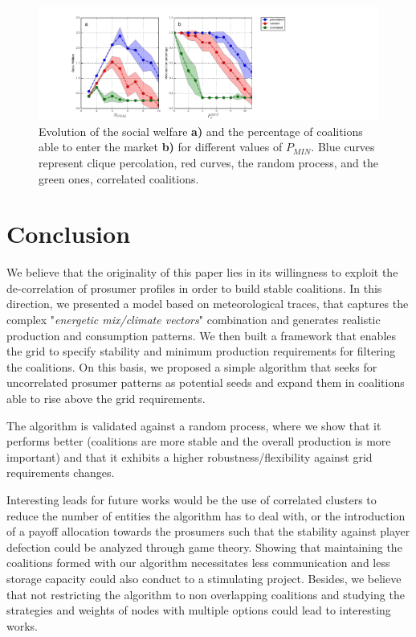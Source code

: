 \documentclass[conference]{IEEEtran}
\begin{document}
\begin{figure}
 \centering
  \includegraphics[scale=0.35]{figure8/fig8.pdf}
  \caption{Evolution of the social welfare \textbf{a)} and the percentage of coalitions able to enter the market \textbf{b)} for different values of $ P_{MIN} $. Blue curves represent clique percolation, red curves, the random process, and the green ones, correlated coalitions.}
 \label{Fig4}
\end{figure}


%
%
\section{Conclusion}
\label{sec:conclusion}

We believe that the originality of this paper lies in its willingness to exploit the de-correlation of prosumer profiles in order to build stable coalitions. In this direction, we presented a model based on meteorological traces, that captures the complex "\textit{energetic mix/climate vectors}" combination and generates realistic production and consumption patterns. We then built a framework that enables the grid to specify stability and minimum production requirements for filtering the coalitions. On this basis, we proposed a simple algorithm that seeks for uncorrelated prosumer patterns as potential seeds and expand them in coalitions able to rise above the grid requirements.

The algorithm is validated against a random process, where we show that it performs better (coalitions are more stable and the overall production is more important) and that it exhibits a higher robustness/flexibility against grid requirements changes.

Interesting leads for future works would be the use of correlated clusters to reduce the number of entities the algorithm has to deal with, or the introduction of a payoff allocation towards the prosumers such that the stability against player defection could be analyzed through game theory. Showing that maintaining the coalitions formed with our algorithm necessitates less communication and less storage capacity could also conduct to a stimulating project. Besides, we believe that not restricting the algorithm to non overlapping coalitions and studying the strategies and weights of nodes with multiple options could lead to interesting works.



%
%
 
  

\end{document}
